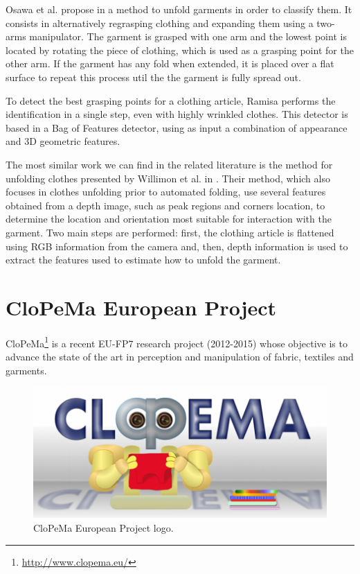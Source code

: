 Osawa et al. propose in \cite{Osawa2006} a method to unfold garments in order to classify them. It consists in alternatively regrasping clothing and expanding them using a two-arms manipulator. The garment is grasped with one arm and the lowest point is located by rotating the piece of clothing, which is used as a grasping point for the other arm. If the garment has any fold when extended, it is placed over a flat surface to repeat this process util the the garment is fully spread out.

To detect the best grasping points for a clothing article, Ramisa \cite{Ramisa2012} performs the identification in a single step, even with highly wrinkled clothes. This detector is based in a Bag of Features detector, using as input a combination of appearance and 3D geometric features.

The most similar work we can find in the related literature is the method for unfolding clothes presented by Willimon et al. in \cite{Willimon2011}. Their method, which also focuses in clothes unfolding prior to automated folding, use several features obtained from a depth image, such as peak regions and corners location, to determine the location and orientation most suitable for interaction with the garment. Two main steps are performed: first, the clothing article is flattened using RGB information from the camera and, then, depth information is used to extract the features used to estimate how to unfold the garment.

\section{CloPeMa European Project}
\label{sota:clopema}

CloPeMa\footnote{\url{http://www.clopema.eu/}} is a recent EU-FP7 research project (2012-2015) whose objective is to advance the state of the art in perception and manipulation of fabric, textiles and garments.

\begin{figure}[thpb]
    \centering
    \includegraphics[width=0.7
    \textwidth]{figures/SOTA_CloPeMa_logo.png}
    \caption{CloPeMa European Project logo.}
    \label{fig:SOTA_CloPeMa_logo}
\end{figure}

